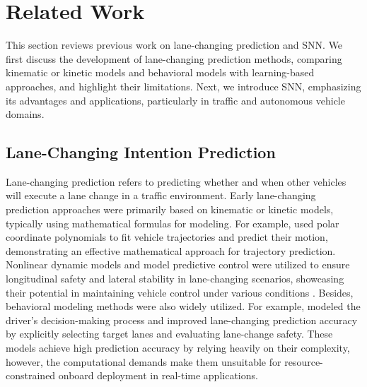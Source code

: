 \section{Related Work}
This section reviews previous work on lane-changing prediction and SNN. We first discuss the development of lane-changing prediction methods, comparing kinematic or kinetic models and behavioral models with learning-based approaches, and highlight their limitations. Next, we introduce SNN, emphasizing its advantages and applications, particularly in traffic and autonomous vehicle domains.
\subsection{Lane-Changing Intention Prediction}
Lane-changing prediction refers to predicting whether and when other vehicles will execute a lane change in a traffic environment.
Early lane-changing prediction approaches were primarily based on kinematic or kinetic models, typically using mathematical formulas for modeling. For example, \cite{nelson1989continuous} used polar coordinate polynomials to fit vehicle trajectories and predict their motion, demonstrating an effective mathematical approach for trajectory prediction. Nonlinear dynamic models and model predictive control were utilized to ensure longitudinal safety and lateral stability in lane-changing scenarios, showcasing their potential in maintaining vehicle control under various conditions \cite{liu2018dynamic}.
Besides, behavioral modeling methods were also widely utilized. For example, \cite{treiber2009modeling} modeled the driver’s decision-making process and improved lane-changing prediction accuracy by explicitly selecting target lanes and evaluating lane-change safety.
These models achieve high prediction accuracy by relying heavily on their complexity, however, the computational demands make them unsuitable for resource-constrained onboard deployment in real-time applications.
